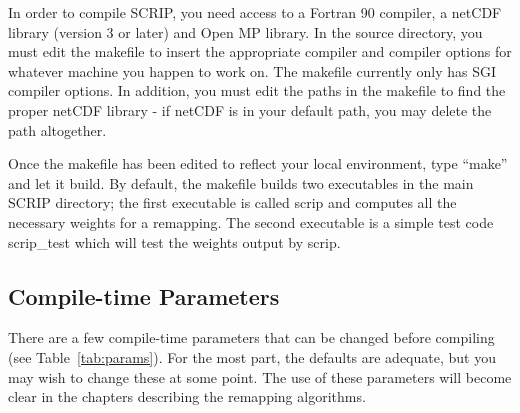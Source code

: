 \documentclass[12pt]{report}
\begin{document}
In order to compile SCRIP, you need access to a
Fortran 90 compiler, a netCDF library (version 3 or
later) and Open MP library.  In the source directory, you must edit the
makefile to insert the appropriate compiler and compiler
options for whatever machine you happen to work on.  The
makefile currently only has SGI compiler options.  In
addition, you must edit the paths in the makefile to
find the proper netCDF library - if netCDF is in your
default path, you may delete the path altogether.

Once the makefile has been edited to reflect your
local environment, type ``make'' and let it
build.  By default, the makefile builds two executables
in the main SCRIP directory;
the first executable is called scrip and computes
all the necessary weights for a remapping.  The second
executable is a simple test code scrip\_test which will
test the weights output by scrip.

\subsection{Compile-time Parameters}

There are a few compile-time parameters that can
be changed before compiling (see Table~\ref{tab:params}).
For the most part, the
defaults are adequate, but you may wish to change
these at some point.  The use of these parameters
will become clear in the chapters describing the
remapping algorithms.
\end{document}
